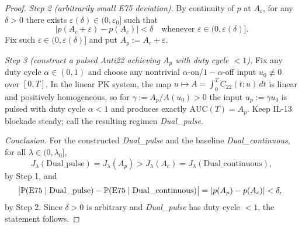 \begin{proof}
\emph{Step 2 (arbitrarily small E75 deviation).} By continuity of $p$ at $A_c$, for any $\delta>0$ there exists $\varepsilon(\delta)\in(0,\varepsilon_0]$ such that
\[|p(A_c+\varepsilon)-p(A_c)|<\delta\quad\text{whenever }\varepsilon\in(0,\varepsilon(\delta)].\]
Fix such $\varepsilon\in(0,\varepsilon(\delta)]$ and put $A_p:=A_c+\varepsilon$.

\emph{Step 3 (construct a pulsed Anti22 achieving $A_p$ with duty cycle $<1$).} Fix any duty cycle $\alpha\in(0,1)$ and choose any nontrivial $\alpha$-on/$1{-}\alpha$-off input $u_0\not\equiv 0$ over $[0,T]$. In the linear PK system, the map $u\mapsto A=\int_0^T C_{22}(t;u)\,dt$ is linear and positively homogeneous, so for $\gamma:=A_p/A(u_0)>0$ the input $u_p:=\gamma u_0$ is pulsed with duty cycle $\alpha<1$ and produces exactly $\mathrm{AUC}(T)=A_p$. Keep IL-13 blockade steady; call the resulting regimen \emph{Dual\_pulse}.

\emph{Conclusion.} For the constructed \emph{Dual\_pulse} and the baseline \emph{Dual\_continuous}, for all $\lambda\in(0,\lambda_0]$,
\[J_\lambda(\mathrm{Dual\_pulse})=J_\lambda(A_p)>J_\lambda(A_c)=J_\lambda(\mathrm{Dual\_continuous}),\]
by Step 1, and
\begin{equation*}
\big|\mathbb P(\mathrm{E75}\mid\mathrm{Dual\_pulse})-\mathbb P(\mathrm{E75}\mid\mathrm{Dual\_continuous})\big|=|p(A_p)-p(A_c)|<\delta,\ \qedhere
\end{equation*}
by Step 2. Since $\delta>0$ is arbitrary and \emph{Dual\_pulse} has duty cycle $<1$, the statement follows.
\end{proof}
